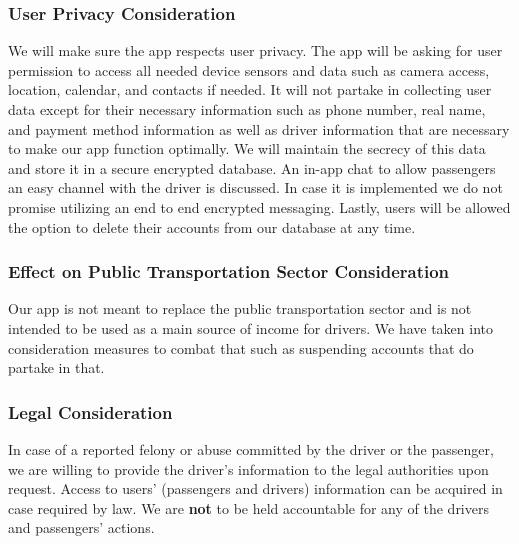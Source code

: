 \documentclass[a4paper, 12pt]{report} %
\begin{document}
                \subsubsection{User Privacy Consideration}
                    We will make sure the app respects user privacy. The app will be asking for user permission to access all needed device sensors and data such as camera access, location, calendar, and contacts if needed. It will not partake in collecting user data except for their necessary information such as phone number, real name, and payment method information as well as driver information that are necessary to make our app function optimally. We will maintain the secrecy of this data and store it in a secure encrypted database. An in-app chat to allow passengers an easy channel with the driver is discussed. In case it is implemented we do not promise utilizing an end to end encrypted messaging. Lastly, users will be allowed the option to delete their accounts from our database at any time. 
                \subsubsection{Effect on Public Transportation Sector Consideration}
                    Our app is not meant to replace the public transportation sector and is not intended to be used as a main source of income for drivers. We have taken into consideration measures to combat that such as suspending accounts that do partake in that.
                \subsubsection{Legal Consideration}
                    In case of a reported felony or abuse committed by the driver or the passenger, we are willing to provide the driver's information to the legal authorities upon request. Access to users' (passengers and drivers) information can be acquired in case required by law. We are \textbf{not} to be held accountable for any of the drivers and passengers' actions.

        \pagebreak
\end{document}
